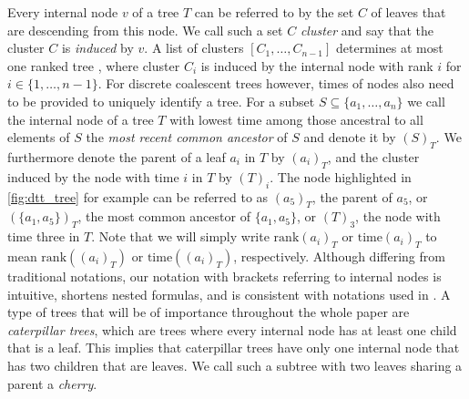 \documentclass[11pt]{amsart}
\newcommand{\rank}{\mathrm{rank}}
\newcommand{\ntime}{\mathrm{time}}
\begin{document}
Every internal node $v$ of a tree $T$ can be referred to by the set $C$ of leaves that are descending from this node.
We call such a set $C$ \emph{cluster} and say that the cluster $C$ is \emph{induced} by $v$.
A list of clusters $[C_1, \ldots, C_{n-1}]$ determines at most one ranked tree \autocite{Collienne2021}, where cluster $C_i$ is induced by the internal node with rank $i$ for $i \in \{1, \ldots, n-1\}$.
For discrete coalescent trees however, times of nodes also need to be provided to uniquely identify a tree.
For a subset $S \subseteq \{a_1, \ldots, a_n\}$ we call the internal node of a tree $T$ with lowest time among those ancestral to all elements of $S$ the \emph{most recent common ancestor} of $S$ and denote it by $(S)_T$.
We furthermore denote the parent of a leaf $a_i$ in $T$ by $(a_i)_T$, and the cluster induced by the node with time $i$ in $T$ by $(T)_i$.
The node highlighted in \autoref{fig:dtt_tree} for example can be referred to as $(a_5)_T$, the parent of $a_5$, or $(\{a_1, a_5\})_T$, the most common ancestor of $\{a_1, a_5\}$, or $(T)_3$, the node with time three in $T$.
Note that we will simply write $\rank(a_i)_T$ or $\ntime(a_i)_T$ to mean $\rank((a_i)_T)$ or $\ntime((a_i)_T)$, respectively.
Although differing from traditional notations, our notation with brackets referring to internal nodes is intuitive, shortens nested formulas, and is consistent with notations used in \autocite{Collienne2021}.
A type of trees that will be of importance throughout the whole paper are \emph{caterpillar trees}, which are trees where every internal node has at least one child that is a leaf.
This implies that caterpillar trees have only one internal node that has two children that are leaves.
We call such a subtree with two leaves sharing a parent a \emph{cherry}.
\end{document}
